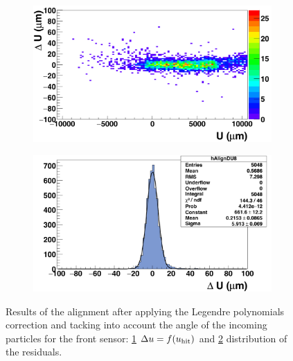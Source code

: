 \begin{figure}[!h]
        \begin{subfigure}[t]{0.45\textwidth}
          \centering
          \includegraphics[width = 1.2\textwidth]{Pictures/deformation/deltaUU_8_corrected1.png}
          \caption{}
          \label{fig:scatterDUU_corrected_front}
        \end{subfigure}
        \hfill
        \begin{subfigure}[t]{0.45\textwidth}
          \centering
          \includegraphics[width = 1.2\textwidth]{Pictures/deformation/deltaU_8_corrected1.png}
          \caption{}
          \label{fig:residualU_corrected}
        \end{subfigure}
        \caption{Results of the alignment after applying the Legendre polynomials correction and tacking into account the angle of the incoming particles for the front sensor: \ref{fig:scatterDUU_corrected_front} $\Delta u=f(u_{\rm{hit}})$ and \ref{fig:residualU_corrected} distribution of the residuals.}
        \label{fig:alignmnetCorrected}

      \end{figure}

